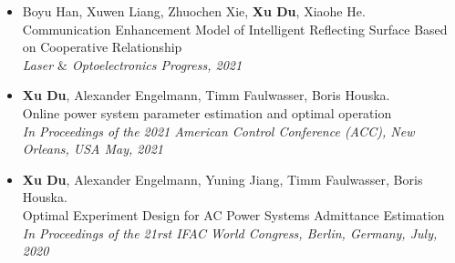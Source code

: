 \documentclass[paper=a4,fontsize=11pt]{scrartcl} %
\begin{document}
\begin{CJK*}{UTF8}{gbsn}
\begin{itemize}
		\item  { Boyu Han, Xuwen Liang, Zhuochen Xie, \textbf{Xu Du}, Xiaohe He. \\
		{Communication Enhancement Model of Intelligent Reflecting Surface Based on Cooperative Relationship}\\
		\emph{Laser $\&$ Optoelectronics Progress, 2021
	} }
	
	\item  { \textbf{Xu Du}, Alexander Engelmann, Timm Faulwasser, Boris Houska. \\
		{Online power system parameter estimation and optimal operation}\\
		\emph{In Proceedings of the 2021 American Control Conference (ACC), New Orleans, USA May, 2021
	} }
	
		\item  {\textbf{Xu Du}, Alexander Engelmann, Yuning Jiang, Timm Faulwasser, Boris Houska. \\
		Optimal Experiment Design for AC Power Systems Admittance Estimation\\
		\emph{In Proceedings of the 21rst IFAC World Congress, Berlin, Germany, July, 2020
		} }
	

\end{itemize}
\end{CJK*}
\end{document}
